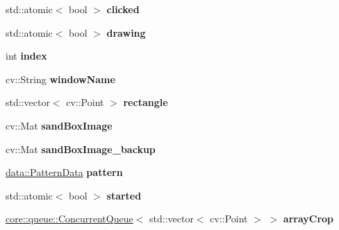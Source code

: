 \begin{DoxyCompactItemize}
\item 
\mbox{\label{classfilter_1_1algos_1_1_cropper_1_1_c_v_cropper_data_a125d07318b2bcfecc55ac734d90b40f4}} 
std\+::atomic$<$ bool $>$ {\bfseries clicked}
\item 
\mbox{\label{classfilter_1_1algos_1_1_cropper_1_1_c_v_cropper_data_aa3d335abd590fb5f988015e6702b0cb6}} 
std\+::atomic$<$ bool $>$ {\bfseries drawing}
\item 
\mbox{\label{classfilter_1_1algos_1_1_cropper_1_1_c_v_cropper_data_a5287f1b333d8f677e1fd50634ec4837a}} 
int {\bfseries index}
\item 
\mbox{\label{classfilter_1_1algos_1_1_cropper_1_1_c_v_cropper_data_a7e35a7d215081ccab6e81ef6d3b136ab}} 
cv\+::\+String {\bfseries window\+Name}
\item 
\mbox{\label{classfilter_1_1algos_1_1_cropper_1_1_c_v_cropper_data_a9781d33a959e2c47ccd407a8ee4727a3}} 
std\+::vector$<$ cv\+::\+Point $>$ {\bfseries rectangle}
\item 
\mbox{\label{classfilter_1_1algos_1_1_cropper_1_1_c_v_cropper_data_aecc2f83db50367e3cebda74e5e80d702}} 
cv\+::\+Mat {\bfseries sand\+Box\+Image}
\item 
\mbox{\label{classfilter_1_1algos_1_1_cropper_1_1_c_v_cropper_data_a699cc8f85489274de5170d2d0e4fe10c}} 
cv\+::\+Mat {\bfseries sand\+Box\+Image\+\_\+backup}
\item 
\mbox{\label{classfilter_1_1algos_1_1_cropper_1_1_c_v_cropper_data_a678ee25c91960fa20892a2c2d7346cf0}} 
\hyperlink{classfilter_1_1data_1_1_pattern_data}{data\+::\+Pattern\+Data} {\bfseries pattern}
\item 
\mbox{\label{classfilter_1_1algos_1_1_cropper_1_1_c_v_cropper_data_a63b558ac47f3f8864f11a747c5736a51}} 
std\+::atomic$<$ bool $>$ {\bfseries started}
\item 
\mbox{\label{classfilter_1_1algos_1_1_cropper_1_1_c_v_cropper_data_a0504eb12cf887367e48a509e976b4b88}} 
\hyperlink{classcore_1_1queue_1_1_concurrent_queue}{core\+::queue\+::\+Concurrent\+Queue}$<$ std\+::vector$<$ cv\+::\+Point $>$ $>$ {\bfseries array\+Crop}
\end{DoxyCompactItemize}



